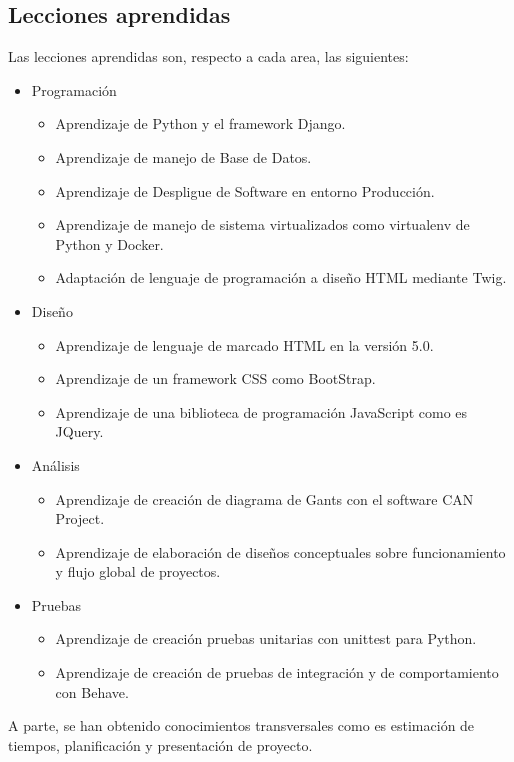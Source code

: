 \documentclass[12pt,letterpaper]{report}
\begin{document}
	\subsection{Lecciones aprendidas}
		Las lecciones aprendidas son, respecto a cada area, las siguientes:
		\begin{itemize}
			\item Programación
			\begin{itemize}
				\item Aprendizaje de Python y el framework Django.
				\item Aprendizaje de manejo de Base de Datos.
				\item Aprendizaje de Despligue de Software en entorno Producción.
				\item Aprendizaje de manejo de sistema virtualizados como virtualenv de Python y Docker.
				\item Adaptación de lenguaje de programación a diseño HTML mediante Twig.
			\end{itemize}
			\item Diseño
			\begin{itemize}
				\item Aprendizaje de lenguaje de marcado HTML en la versión 5.0.
				\item Aprendizaje de un framework CSS como BootStrap.
				\item Aprendizaje de una biblioteca de programación JavaScript como es JQuery.
			\end{itemize}
			\item Análisis
			\begin{itemize}
				\item Aprendizaje de creación de diagrama de Gants con el software CAN Project.
				\item Aprendizaje de elaboración de diseños conceptuales sobre funcionamiento y flujo global de proyectos.
			\end{itemize}
			\item Pruebas
			\begin{itemize}
				\item Aprendizaje de creación pruebas unitarias con unittest para Python.
				\item Aprendizaje de creación de pruebas de integración y de comportamiento con Behave.
			\end{itemize}
		\end{itemize}
		A parte, se han obtenido conocimientos transversales como es estimación de
		tiempos, planificación y presentación de proyecto.
\end{document}
